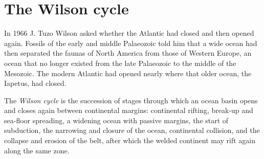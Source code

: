 \begin{omfigure}
\par{}
\end{omfigure}

\section{The Wilson cycle}\label{sec:b2:wilson-cycle:cycle}

In 1966 J. Tuzo Wilson asked whether the Atlantic had closed and then
opened again. Fossils of the early and middle Palaeozoic told him that a wide ocean had then
separated the faunas of North America from those of Western Europe, an ocean that no longer
existed from the late Palaeozoic to the middle of the Mesozoic. The modern Atlantic had opened
nearly where that older ocean, the Iapetus, had closed.

\begin{definition}\label{def:b2:wilson-cycle:wilson}
The \emph{Wilson cycle} is the succession of stages through which an
ocean basin opens and closes again between continental margins: continental rifting,
break-up and sea-floor spreading, a widening ocean with passive margins, the start of
subduction, the narrowing and closure of the ocean, continental collision, and the collapse
and erosion of the belt, after which the welded continent may rift again along the same zone.
\end{definition}

